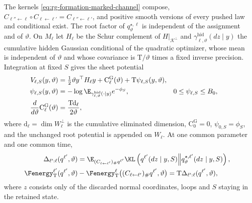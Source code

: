 The kernels \cref{eq:rg-formation-marked-channel} compose,
\(C_{\ell''\leftarrow\ell}\circ C_{\ell\leftarrow\ell'}=C_{\ell''\leftarrow\ell'}\),
and positive smooth versions of every pushed law and conditional exist. The
root factor of \(q^{\star,\ell}_\vartheta\) is independent of the assignment
and of \(\vartheta\). On \(M_\ell\) let \(H_\ell\) be the Schur complement of
\(H|_{\mathcal K^\perp}\) and \(\gamma^{\mathrm{hid}}_{\ell,\vartheta}(dz\mid y)\)
the cumulative hidden Gaussian conditional of the quadratic optimizer, whose
mean is independent of \(\vartheta\) and whose covariance is
\(\mathrm T/\vartheta\) times a fixed inverse precision. Integration at fixed
\(S\) gives the sheet potential
\begin{equation}
\begin{aligned}
V_{\ell,S}(y,\vartheta)
 &=\tfrac12\vartheta y^\top H_\ell y+\mathrm C_\ell^{\mathrm G}(\vartheta)
       +\mathrm T\psi_{\ell,S}(y,\vartheta),\\
\psi_{\ell,S}(y,\vartheta)
 &=-\log\E_{\gamma^{\mathrm{hid}}_{\ell,\vartheta}(\cdot\mid y)}
                  e^{-\phi_S},&
0&\le\psi_{\ell,S}\le B_0,\\
\frac{d}{d\vartheta}\mathrm C_\ell^{\mathrm G}(\vartheta)
 &=\frac{\mathrm T \mathrm d_\ell}{2\vartheta},
\end{aligned}
\label{eq:rg-formation-parent-potential}
\end{equation}
where \(\mathrm d_\ell=\dim W_\ell^\perp\) is the cumulative eliminated
dimension, \(\mathrm C_0^{\mathrm G}=0\), \(\psi_{0,S}=\phi_S\), and the
unchanged root potential is appended on \(W_\ell\). At one common parameter
and one common time,
\begin{equation}
\begin{aligned}
\Delta_{\ell':\ell}(q^{\ell'},\vartheta)
 &=\E_{(C_{\ell\leftarrow\ell'})_\#q^{\ell'}}
   \KL\left(q^{\ell'}(dz\mid y,S)
        \middle\Vert q^{\star,\ell'}_\vartheta(dz\mid y,S)\right),\\
\Fenergy_{\mathrm T}^{\ell'}(q^{\ell'},\vartheta)
 &-\Fenergy_{\mathrm T}^\ell\bigl((C_{\ell\leftarrow\ell'})_\#q^{\ell'},\vartheta\bigr)
   =\mathrm T\Delta_{\ell':\ell}(q^{\ell'},\vartheta),
\end{aligned}
\label{eq:rg-formation-conditional-cost}
\end{equation}
where \(z\) consists only of the discarded normal coordinates, loops and
\(S\) staying in the retained state. 

